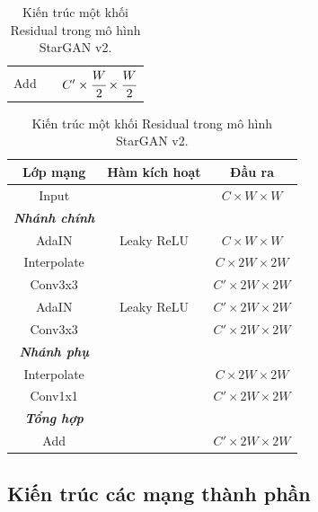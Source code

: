 \documentclass[12pt]{extreport}
\begin{document}
\begin{table}[H]
\begin{subtable}[H]{.48\textwidth}
\begin{adjustbox}{width=\textwidth}
\begin{tabular}{c c c}
                Add             &               & $ C' \times \cfrac{W}{2}  \times \cfrac{W}{2} $ \\
            \end{tabular}
        \end{adjustbox}
    \end{subtable}
    \begin{subtable}[H]{.48\textwidth}
        \begin{adjustbox}{width=\textwidth}
            \begin{tabular}{c c c}
                Lớp mạng    & Hàm kích hoạt & Đầu ra                      \\
                \hline
                Input       &               & $ C \times W \times W $     \\
                \hline
                \textbf{\textit{Nhánh chính}}                             \\
                AdaIN       & Leaky ReLU    & $ C \times W \times W $     \\
                Interpolate &               & $ C \times 2W  \times 2W $  \\
                Conv3x3     &               & $ C' \times 2W  \times 2W $ \\
                AdaIN       & Leaky ReLU    & $ C' \times 2W \times 2W $  \\
                Conv3x3     &               & $ C' \times 2W  \times 2W $ \\
                \hline
                \textbf{\textit{Nhánh phụ}}                               \\
                Interpolate &               & $ C \times 2W  \times 2W $  \\
                Conv1x1     &               & $ C' \times 2W  \times 2W $ \\
                \hline
                \textbf{\textit{Tổng hợp}}                                \\
                Add         &               & $ C' \times 2W  \times 2W $ \\
            \end{tabular}
        \end{adjustbox}
    \end{subtable}
    \caption{Kiến trúc một khối Residual trong mô hình StarGAN v2.}
\end{table}

\subsection{Kiến trúc các mạng thành phần}
\end{document}
